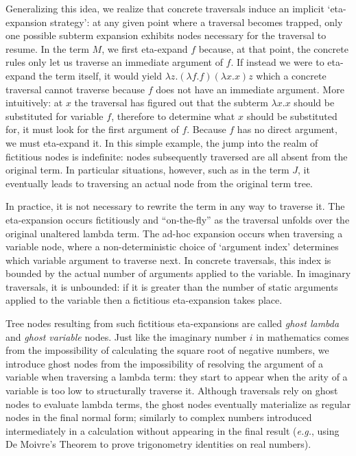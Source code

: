 \documentclass[xchauthor,chkrefs,GCNS,amsmath,amsthm,rotating,leaveRGB]{tcsg}
\theoremstyle{plain}
\theoremstyle{definition}
\begin{document}
Generalizing this idea, we realize that concrete traversals induce an
implicit `eta-expansion strategy': at any given point where a traversal becomes trapped,
only one possible subterm expansion exhibits nodes
necessary for the traversal to resume. In the term $M$, we first eta-expand
$f$ because, at that point, the concrete rules only let us traverse an
immediate argument of $f$. If instead we were to eta-expand the term itself,
it would yield $\lambda z. (\lambda f .f)(\lambda x.x) z$ which a concrete
traversal cannot traverse because $f$ does not have an immediate argument. More
intuitively: at $x$ the traversal has figured out that the subterm $\lambda
x.x$ should be substituted for variable $f$, therefore to determine what $x$
should be substituted for, it must look for the first argument of $f$.
Because $f$ has no direct argument, we must eta-expand it. In this simple
example, the jump into the realm of fictitious nodes is indefinite: nodes
subsequently traversed are all absent from the original term.
In particular situations, however, such as in the term $J$, it eventually leads to
traversing an actual node from the original term tree.

In practice, it is not necessary to rewrite the term in any way
to
traverse it. The eta-expansion occurs fictitiously and ``on-the-fly'' as the
traversal unfolds over the original unaltered lambda term. The ad-hoc
expansion occurs when traversing a variable node, where a non-deterministic
choice of `argument index' determines which variable argument to traverse
next. In concrete traversals, this index is bounded by the actual number of
arguments applied to the variable. In imaginary traversals, it is unbounded:
if it is greater than the number of static arguments applied to the variable
then a fictitious eta-expansion takes place.

Tree nodes resulting from such fictitious eta-expansions are called
\emph{ghost lambda} and \emph{ghost variable} nodes. Just like the imaginary
number $i$ in mathematics comes from the impossibility of calculating the
square root of negative numbers, we introduce ghost nodes from the
impossibility of resolving the argument of a variable when traversing a
lambda term: they start to appear when the arity of a variable is too low to
structurally traverse it. Although traversals rely on ghost nodes to evaluate
lambda terms, the ghost nodes eventually materialize as regular nodes in the
final normal form; similarly to complex numbers introduced intermediately in
a calculation without appearing in the final result (\textit{e.g.}, using De
Moivre's Theorem to prove trigonometry identities on real numbers).
\end{document}
